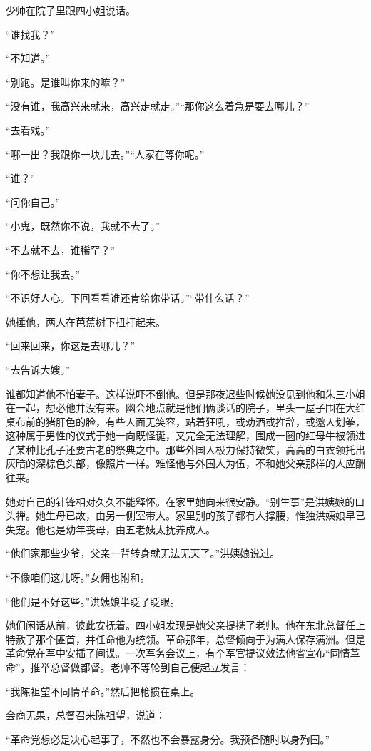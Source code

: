 \par 少帅在院子里跟四小姐说话。
\par “谁找我？”
\par “不知道。”
\par “别跑。是谁叫你来的嘛？”
\par “没有谁，我高兴来就来，高兴走就走。”“那你这么着急是要去哪儿？”
\par “去看戏。”
\par “哪一出？我跟你一块儿去。”“人家在等你呢。”
\par “谁？”
\par “问你自己。”
\par “小鬼，既然你不说，我就不去了。”
\par “不去就不去，谁稀罕？”
\par “你不想让我去。”
\par “不识好人心。下回看看谁还肯给你带话。”“带什么话？”
\par 她捶他，两人在芭蕉树下扭打起来。
\par “回来回来，你这是去哪儿？”
\par “去告诉大嫂。”
\par 谁都知道他不怕妻子。这样说吓不倒他。但是那夜迟些时候她没见到他和朱三小姐在一起，想必他并没有来。幽会地点就是他们俩谈话的院子，里头一屋子围在大红桌布前的猪肝色的脸，有些人面无笑容，站着狂吼，或劝酒或推辞，或邀人划拳，这种属于男性的仪式于她一向既怪诞，又完全无法理解，围成一圈的红母牛被领进了某种比孔子还要古老的祭典之中。那些外国人极力保持微笑，高高的白衣领托出灰暗的深棕色头部，像照片一样。难怪他与外国人为伍，不和她父亲那样的人应酬往来。
\par 她对自己的针锋相对久久不能释怀。在家里她向来很安静。“别生事”是洪姨娘的口头禅。她生母已故，由另一侧室带大。家里别的孩子都有人撑腰，惟独洪姨娘早已失宠。他也是幼年丧母，由五老姨太抚养成人。
\par “他们家那些少爷，父亲一背转身就无法无天了。”洪姨娘说过。
\par “不像咱们这儿呀。”女佣也附和。
\par “他们是不好这些。”洪姨娘半眨了眨眼。
\par 她们闲话从前，彼此安抚着。四小姐发现是她父亲提携了老帅。他在东北总督任上特赦了那个匪首，并任命他为统领。革命那年，总督倾向于为满人保存满洲。但是革命党在军中安插了间谍。一次军务会议上，有个军官提议效法他省宣布“同情革命”，推举总督做都督。老帅不等轮到自己便起立发言：
\par “我陈祖望不同情革命。”然后把枪掼在桌上。
\par 会商无果，总督召来陈祖望，说道：
\par “革命党想必是决心起事了，不然也不会暴露身分。我预备随时以身殉国。”
